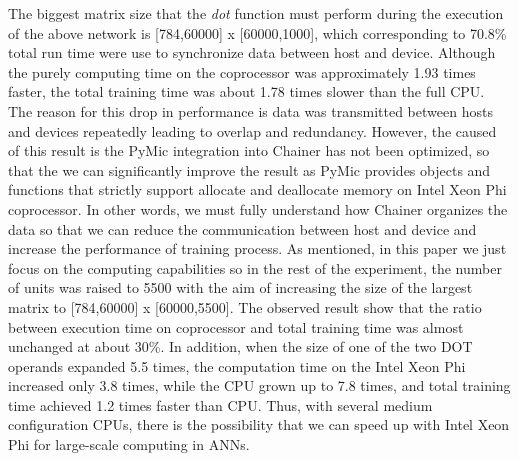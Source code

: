 The biggest matrix size that the \textit{dot} function must perform during the execution of the above network is [784,60000] x [60000,1000], which corresponding to 70.8\% total run time were use to synchronize data between host and device. Although the purely  computing time on the coprocessor was approximately 1.93 times faster, the total training time was about 1.78 times slower than the full CPU. The reason for this drop in performance is data was transmitted between hosts and devices repeatedly leading to overlap and redundancy. However, the caused of this result is the PyMic integration into Chainer has not been optimized, so that the we can significantly improve the result as PyMic provides objects and functions that strictly support allocate and deallocate memory on Intel Xeon Phi coprocessor. In other words, we must fully understand how Chainer organizes the data so that we can reduce the communication between host and device and increase the performance of training process. As mentioned, in this paper we just focus on the computing capabilities so in the rest of the experiment, the number of units was raised to 5500 with the aim of increasing the size of the largest matrix to [784,60000] x [60000,5500]. The observed result show that the ratio between execution time on coprocessor and total training time was almost unchanged at about 30\%. In addition, when the size of one of the two DOT operands expanded 5.5 times, the computation time on the Intel Xeon Phi increased only 3.8 times, while the CPU grown up to 7.8 times, and total training time achieved 1.2 times faster than CPU. Thus, with several medium configuration CPUs, there is the possibility that we can speed up with Intel Xeon Phi for large-scale computing in ANNs.
